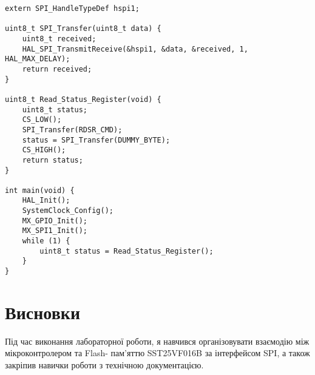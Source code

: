 \documentclass[oneside,14pt]{extarticle}
\begin{document}
\begin{normalsize}
{\begin{lstlisting}
extern SPI_HandleTypeDef hspi1;

uint8_t SPI_Transfer(uint8_t data) {
    uint8_t received;
    HAL_SPI_TransmitReceive(&hspi1, &data, &received, 1, HAL_MAX_DELAY);
    return received;
}

uint8_t Read_Status_Register(void) {
    uint8_t status;
    CS_LOW();
    SPI_Transfer(RDSR_CMD);
    status = SPI_Transfer(DUMMY_BYTE);
    CS_HIGH();
    return status;
}

int main(void) {
    HAL_Init();
    SystemClock_Config();
    MX_GPIO_Init();
    MX_SPI1_Init();
    while (1) {
        uint8_t status = Read_Status_Register();
    }
}\end{lstlisting}}
	
	\section*{Висновки}
	Під час виконання лабораторної роботи, я навчився організовувати взаємодію між мікроконтролером та Flash-
пам’яттю SST25VF016B за інтерфейсом SPI, а також закріпив навички роботи з
технічною документацією.
	    
\end{normalsize}
\end{document}
